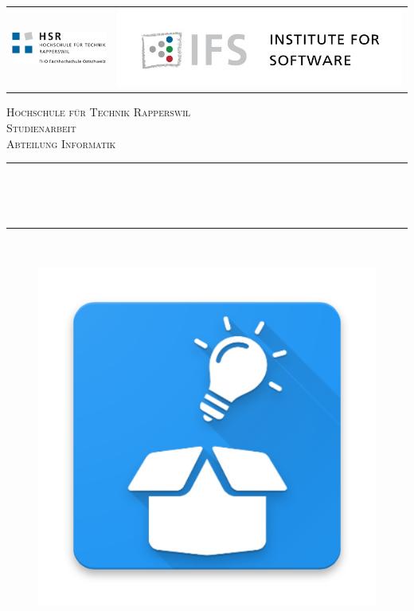 \begin{titlepage}

\newcommand{\HRule}{\rule{\linewidth}{0.5mm}} %

\center %
\begin{table}[h]
	\begin{tabular}{lr}
		\includegraphics[width=0.3\linewidth]{img/logo/logo-hsr}	\hspace{3cm}
		&
		\includegraphics[width=0.45\linewidth]{img/logo/logo-ifs}
	\end{tabular}
\end{table}
\vspace{0.75cm}
\textsc{\LARGE Hochschule für Technik Rapperswil }\\[1.5cm] %
\textsc{\Large Studienarbeit}\\[0.5cm] %
\textsc{\large Abteilung Informatik}\\[0.5cm] %


\makeatletter
\HRule \\[0.4cm]
\begin{doublespacing}
{ \huge \textbf{\@title}}\\[0.2cm] %
\end{doublespacing}
\HRule \\[0.4cm]
 
\begin{figure}[h]
	\centering
	\includegraphics[width=0.5\linewidth]{img/logo/logo-box}
	\label{fig:logo}
\end{figure}



\end{titlepage}
